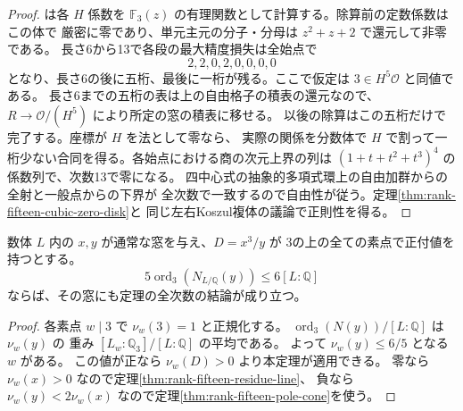 \begin{proof}
 は各 $H$ 係数を
$\mathbb F_3(z)$ の有理関数として計算する。除算前の定数係数はこの体で
厳密に零であり、単元主元の分子・分母は $z^2+z+2$ で還元して非零である。
長さ6から13で各段の最大精度損失は全始点で
\[
                             2,2,0,2,0,0,0,0
\]
となり、長さ6の後に五桁、最後に一桁が残る。ここで仮定は $3\in H^5\mathcal O$ と同値である。
長さ6までの五桁の表は上の自由格子の積表の還元なので、
$R\to\mathcal O/(H^5)$ により所定の窓の積表に移せる。
以後の除算はこの五桁だけで完了する。座標が $H$ を法として零なら、
実際の関係を分数体で $H$ で割って一桁少ない合同を得る。各始点における商の次元上界の列は
$(1+t+t^2+t^3)^4$ の係数列で、次数13で零になる。
四中心式の抽象的多項式環上の自由加群からの全射と一般点からの下界が
全次数で一致するので自由性が従う。定理\ref{thm:rank-fifteen-cubic-zero-disk}と
同じ左右Koszul複体の議論で正則性を得る。
\end{proof}

\begin{corollary}
数体 $L$ 内の $x,y$ が通常な窓を与え、$D=x^3/y$ が
3の上の全ての素点で正付値を持つとする。
\[
  5\operatorname{ord}_3\!\left(N_{L/\mathbb Q}(y)\right)\le6[L:\mathbb Q]
\]
ならば、その窓にも定理の全次数の結論が成り立つ。
\end{corollary}
\begin{proof}
各素点 $w\mid3$ で $\nu_w(3)=1$ と正規化する。
$\operatorname{ord}_3(N(y))/[L:\mathbb Q]$ は $\nu_w(y)$ の
重み $[L_w:\mathbb Q_3]/[L:\mathbb Q]$ の平均である。
よって $\nu_w(y)\le6/5$ となる $w$ がある。
この値が正なら $\nu_w(D)>0$ より本定理が適用できる。
零なら $\nu_w(x)>0$ なので定理\ref{thm:rank-fifteen-residue-line}、
負なら $\nu_w(y)<2\nu_w(x)$ なので定理\ref{thm:rank-fifteen-pole-cone}を使う。
\end{proof}
